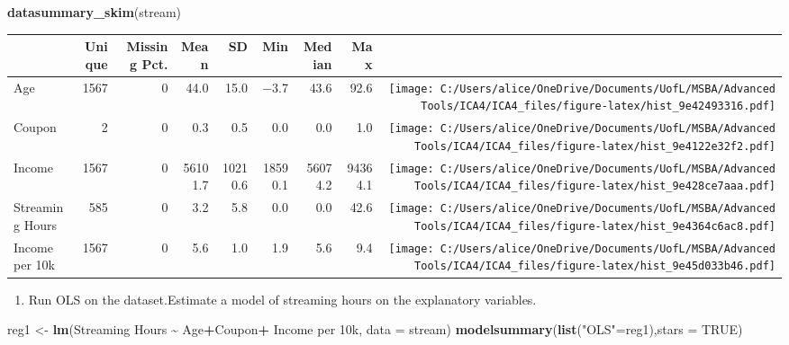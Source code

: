 \documentclass[
]{article}
\newenvironment{Shaded}{\begin{snugshade}}{\end{snugshade}}
\newcommand{\AttributeTok}[1]{\textcolor[rgb]{0.13,0.29,0.53}{#1}}
\newcommand{\ConstantTok}[1]{\textcolor[rgb]{0.56,0.35,0.01}{#1}}
\newcommand{\FunctionTok}[1]{\textcolor[rgb]{0.13,0.29,0.53}{\textbf{#1}}}
\newcommand{\NormalTok}[1]{#1}
\newcommand{\OtherTok}[1]{\textcolor[rgb]{0.56,0.35,0.01}{#1}}
\newcommand{\SpecialCharTok}[1]{\textcolor[rgb]{0.81,0.36,0.00}{\textbf{#1}}}
\newcommand{\StringTok}[1]{\textcolor[rgb]{0.31,0.60,0.02}{#1}}
\providecommand{\tightlist}{%
  \setlength{\itemsep}{0pt}\setlength{\parskip}{0pt}}
\begin{document}
\begin{Shaded}
\begin{Highlighting}[]
\FunctionTok{datasummary\_skim}\NormalTok{(stream)}
\end{Highlighting}
\end{Shaded}

\begin{table}
\centering
\begin{tabular}[t]{lrrrrrrr>{}r}
\toprule
  & Unique & Missing Pct. & Mean & SD & Min & Median & Max &   \\
\midrule
Age & 1567 & 0 & \num{44.0} & \num{15.0} & \num{-3.7} & \num{43.6} & \num{92.6} & \texttt{[image: C:/Users/alice/OneDrive/Documents/UofL/MSBA/Advanced Tools/ICA4/ICA4\_files/figure-latex/hist\_9e42493316.pdf]}\\
Coupon & 2 & 0 & \num{0.3} & \num{0.5} & \num{0.0} & \num{0.0} & \num{1.0} & \texttt{[image: C:/Users/alice/OneDrive/Documents/UofL/MSBA/Advanced Tools/ICA4/ICA4\_files/figure-latex/hist\_9e4122e32f2.pdf]}\\
Income & 1567 & 0 & \num{56101.7} & \num{10210.6} & \num{18590.1} & \num{56074.2} & \num{94364.1} & \texttt{[image: C:/Users/alice/OneDrive/Documents/UofL/MSBA/Advanced Tools/ICA4/ICA4\_files/figure-latex/hist\_9e428ce7aaa.pdf]}\\
Streaming Hours & 585 & 0 & \num{3.2} & \num{5.8} & \num{0.0} & \num{0.0} & \num{42.6} & \texttt{[image: C:/Users/alice/OneDrive/Documents/UofL/MSBA/Advanced Tools/ICA4/ICA4\_files/figure-latex/hist\_9e4364c6ac8.pdf]}\\
Income per 10k & 1567 & 0 & \num{5.6} & \num{1.0} & \num{1.9} & \num{5.6} & \num{9.4} & \texttt{[image: C:/Users/alice/OneDrive/Documents/UofL/MSBA/Advanced Tools/ICA4/ICA4\_files/figure-latex/hist\_9e45d033b46.pdf]}\\
\bottomrule
\end{tabular}
\end{table}

\begin{enumerate}
\def\labelenumi{\alph{enumi})}
\setcounter{enumi}{1}
\tightlist
\item
  Run OLS on the dataset.Estimate a model of streaming hours on the
  explanatory variables.
\end{enumerate}

\begin{Shaded}
\begin{Highlighting}[]
\NormalTok{reg1 }\OtherTok{\textless{}{-}} \FunctionTok{lm}\NormalTok{(}\StringTok{\textasciigrave{}}\AttributeTok{Streaming Hours}\StringTok{\textasciigrave{}} \SpecialCharTok{\textasciitilde{}}\NormalTok{ Age}\SpecialCharTok{+}\NormalTok{Coupon}\SpecialCharTok{+} \StringTok{\textasciigrave{}}\AttributeTok{Income per 10k}\StringTok{\textasciigrave{}}\NormalTok{, }\AttributeTok{data =}\NormalTok{ stream)}
\FunctionTok{modelsummary}\NormalTok{(}\FunctionTok{list}\NormalTok{(}\StringTok{"OLS"}\OtherTok{=}\NormalTok{reg1),}\AttributeTok{stars =} \ConstantTok{TRUE}\NormalTok{)}
\end{Highlighting}
\end{Shaded}
\end{document}
